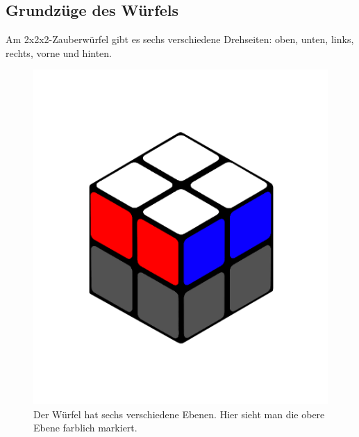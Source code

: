 \documentclass[12pt,a4paper, usenames, dvipsnames]{article}
\begin{document}
\subsection*{Grundzüge des Würfels} 
Am 2x2x2-Zauberwürfel gibt es sechs verschiedene Drehseiten: oben, unten, links, rechts, vorne und hinten. 
\begin{figure}[h]
\centering
\includegraphics[scale=0.1]{ebene.png}
\caption[Ebene des Würfels]{Der Würfel hat sechs verschiedene Ebenen. Hier sieht man die obere Ebene farblich markiert.}
\end{figure}
\end{document}
